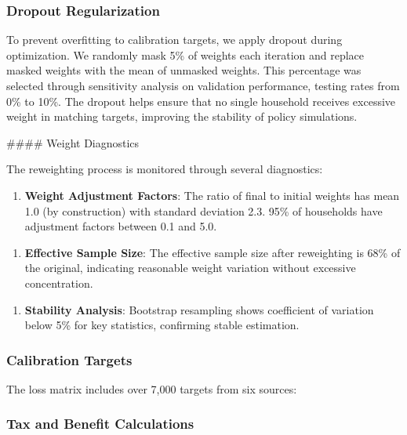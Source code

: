 \subsubsection{Dropout Regularization}

To prevent overfitting to calibration targets, we apply dropout during optimization. We randomly mask 5\% of weights each iteration and replace masked weights with the mean of unmasked weights. This percentage was selected through sensitivity analysis on validation performance, testing rates from 0\% to 10\%. The dropout helps ensure that no single household receives excessive weight in matching targets, improving the stability of policy simulations.

\#\#\#\# Weight Diagnostics

The reweighting process is monitored through several diagnostics:

\begin{enumerate}
\item \textbf{Weight Adjustment Factors}: The ratio of final to initial weights has mean 1.0 (by construction) with standard deviation 2.3. 95\% of households have adjustment factors between 0.1 and 5.0.
\end{enumerate}

\begin{enumerate}
\item \textbf{Effective Sample Size}: The effective sample size after reweighting is 68\% of the original, indicating reasonable weight variation without excessive concentration.
\end{enumerate}

\begin{enumerate}
\item \textbf{Stability Analysis}: Bootstrap resampling shows coefficient of variation below 5\% for key statistics, confirming stable estimation.
\end{enumerate}

\subsubsection{Calibration Targets}

The loss matrix includes over 7,000 targets from six sources:



\subsubsection{Tax and Benefit Calculations}

